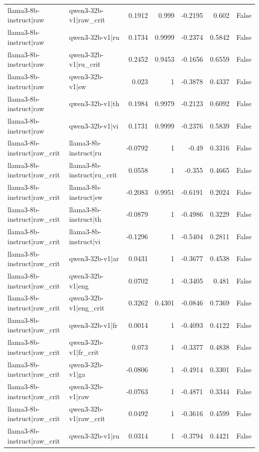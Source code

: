 \begin{table}
\begin{tabular}{l l r r r r l}
llama3-8b-instruct|raw & qwen3-32b-v1|raw_crit & 0.1912 & 0.999 & -0.2195 & 0.602 & False \\
llama3-8b-instruct|raw & qwen3-32b-v1|ru & 0.1734 & 0.9999 & -0.2374 & 0.5842 & False \\
llama3-8b-instruct|raw & qwen3-32b-v1|ru_crit & 0.2452 & 0.9453 & -0.1656 & 0.6559 & False \\
llama3-8b-instruct|raw & qwen3-32b-v1|sw & 0.023 & 1 & -0.3878 & 0.4337 & False \\
llama3-8b-instruct|raw & qwen3-32b-v1|th & 0.1984 & 0.9979 & -0.2123 & 0.6092 & False \\
llama3-8b-instruct|raw & qwen3-32b-v1|vi & 0.1731 & 0.9999 & -0.2376 & 0.5839 & False \\
llama3-8b-instruct|raw_crit & llama3-8b-instruct|ru & -0.0792 & 1 & -0.49 & 0.3316 & False \\
llama3-8b-instruct|raw_crit & llama3-8b-instruct|ru_crit & 0.0558 & 1 & -0.355 & 0.4665 & False \\
llama3-8b-instruct|raw_crit & llama3-8b-instruct|sw & -0.2083 & 0.9951 & -0.6191 & 0.2024 & False \\
llama3-8b-instruct|raw_crit & llama3-8b-instruct|th & -0.0879 & 1 & -0.4986 & 0.3229 & False \\
llama3-8b-instruct|raw_crit & llama3-8b-instruct|vi & -0.1296 & 1 & -0.5404 & 0.2811 & False \\
llama3-8b-instruct|raw_crit & qwen3-32b-v1|ar & 0.0431 & 1 & -0.3677 & 0.4538 & False \\
llama3-8b-instruct|raw_crit & qwen3-32b-v1|eng & 0.0702 & 1 & -0.3405 & 0.481 & False \\
llama3-8b-instruct|raw_crit & qwen3-32b-v1|eng_crit & 0.3262 & 0.4301 & -0.0846 & 0.7369 & False \\
llama3-8b-instruct|raw_crit & qwen3-32b-v1|fr & 0.0014 & 1 & -0.4093 & 0.4122 & False \\
llama3-8b-instruct|raw_crit & qwen3-32b-v1|fr_crit & 0.073 & 1 & -0.3377 & 0.4838 & False \\
llama3-8b-instruct|raw_crit & qwen3-32b-v1|ga & -0.0806 & 1 & -0.4914 & 0.3301 & False \\
llama3-8b-instruct|raw_crit & qwen3-32b-v1|raw & -0.0763 & 1 & -0.4871 & 0.3344 & False \\
llama3-8b-instruct|raw_crit & qwen3-32b-v1|raw_crit & 0.0492 & 1 & -0.3616 & 0.4599 & False \\
llama3-8b-instruct|raw_crit & qwen3-32b-v1|ru & 0.0314 & 1 & -0.3794 & 0.4421 & False \\

\end{tabular}
\end{table}
